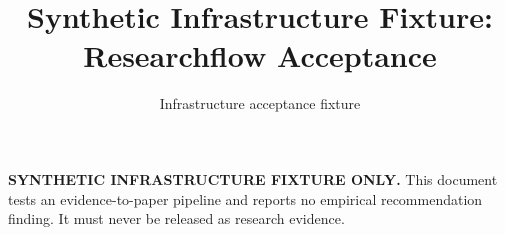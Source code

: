 \documentclass{article}
\title{Synthetic Infrastructure Fixture: Researchflow Acceptance}
\author{Infrastructure acceptance fixture}
\date{}
\begin{document}
\maketitle

\noindent\textbf{SYNTHETIC INFRASTRUCTURE FIXTURE ONLY.}
This document tests an evidence-to-paper pipeline and reports no empirical
recommendation finding. It must never be released as research evidence.






\end{document}
